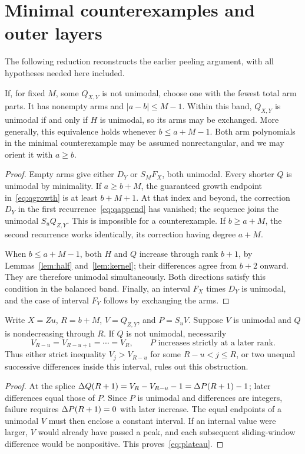 \section{Minimal counterexamples and outer layers}\label{sec:peeling}
The following reduction reconstructs the earlier peeling argument, with all hypotheses needed here included.

\begin{lemma}\label{lem:balanced}
If, for fixed $M$, some $Q_{X,Y}$ is not unimodal, choose one with the fewest total arm parts. It has nonempty arms and $|a-b|\le M-1$. Within this band, $Q_{X,Y}$ is unimodal if and only if $H$ is unimodal, so its arms may be exchanged. More generally, this equivalence holds whenever $b\le a+M-1$. Both arm polynomials in the minimal counterexample may be assumed nonrectangular, and we may orient it with $a\ge b$.
\end{lemma}
\begin{proof}
Empty arms give either $D_Y$ or $S_MF_X$, both unimodal. Every shorter $Q$ is unimodal by minimality. If $a\ge b+M$, the guaranteed growth endpoint in~\eqref{eq:qgrowth} is at least $b+M+1$. At that index and beyond, the correction $D_Y$ in the first recurrence~\eqref{eq:qappend} has vanished; the sequence joins the unimodal $S_uQ_{Z,Y}$. This is impossible for a counterexample. If $b\ge a+M$, the second recurrence works identically, its correction having degree $a+M$.

When $b\le a+M-1$, both $H$ and $Q$ increase through rank $b+1$, by Lemmas~\ref{lem:half} and~\ref{lem:kernel}; their differences agree from $b+2$ onward. They are therefore unimodal simultaneously. Both directions satisfy this condition in the balanced band. Finally, an interval $F_X$ times $D_Y$ is unimodal, and the case of interval $F_Y$ follows by exchanging the arms.
\end{proof}

\begin{lemma}\label{lem:splice}
Write $X=Zu$, $R=b+M$, $V=Q_{Z,Y}$, and $P=S_uV$. Suppose $V$ is unimodal and $Q$ is nondecreasing through $R$. If $Q$ is not unimodal, necessarily
\begin{equation}\label{eq:plateau}
 V_{R-u}=V_{R-u+1}=\cdots=V_R,
 \qquad P\text{ increases strictly at a later rank}.
\end{equation}
Thus either strict inequality $V_j>V_{R-u}$ for some $R-u<j\le R$, or two unequal successive differences inside this interval, rules out this obstruction.
\end{lemma}
\begin{proof}
At the splice $\Delta Q(R+1)=V_R-V_{R-u}-1=\Delta P(R+1)-1$; later differences equal those of $P$. Since $P$ is unimodal and differences are integers, failure requires $\Delta P(R+1)=0$ with later increase. The equal endpoints of a unimodal $V$ must then enclose a constant interval. If an internal value were larger, $V$ would already have passed a peak, and each subsequent sliding-window difference would be nonpositive. This proves~\eqref{eq:plateau}.
\end{proof}

